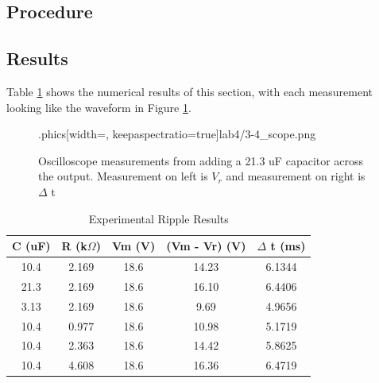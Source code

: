 \documentclass[12pt,letterpaper]{report}
\begin{document}
\subsection*{Procedure}


\subsection*{Results}
Table \ref{table:ripple_results} shows the numerical results of this section, with each measurement looking like the waveform in Figure \ref{fig:3-4_scope}. 
\begin{figure}[H]
\centering
{}.phics[width=\linewidth, keepaspectratio=true]{lab4/3-4_scope.png}
\caption{Oscilloscope measurements from adding a 21.3 uF capacitor across the output. Measurement on left is $V_r$ and measurement on right is $\Delta$ t}
\label{fig:3-4_scope}
\end{figure}

\begin{table}[ht]
\caption{Experimental Ripple Results} %
\centering 
    \begin{tabular}{| c | c | c | c | c |}
    \hline  
    C (uF) & R (k$\Omega$) & Vm (V) & (Vm - Vr) (V) & $\Delta$ t (ms)\\
    \hline
    10.4 & 2.169 & 18.6 & 14.23 & 6.1344 \\
    21.3 & 2.169 & 18.6 & 16.10 & 6.4406 \\
    3.13 & 2.169 & 18.6 &  9.69 & 4.9656 \\
    10.4 & 0.977 & 18.6 & 10.98 & 5.1719 \\
    10.4 & 2.363 & 18.6 & 14.42 & 5.8625 \\
    10.4 & 4.608 & 18.6 & 16.36 & 6.4719 \\
    \hline
    \end{tabular}
    \label{table:ripple_results}
\end{table}
\end{document}

